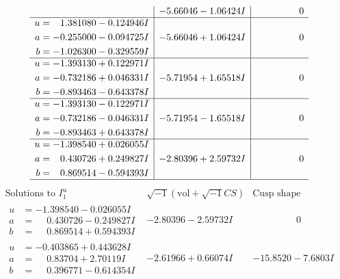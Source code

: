 \documentclass[1p]{elsarticle_modified}
\theoremstyle{definition}
\newcommand{\I}{\sqrt{-1}}
\begin{document}
$$\begin{array}{c|c|c}
 & -5.66046 - 1.06424 I & \phantom{-0.000000 } 0 \\ \hline\begin{aligned}
u &= \phantom{-}1.381080 - 0.124946 I \\
a &= -0.255000 - 0.094725 I \\
b &= -1.026300 - 0.329559 I\end{aligned}
 & -5.66046 + 1.06424 I & \phantom{-0.000000 } 0 \\ \hline\begin{aligned}
u &= -1.393130 + 0.122971 I \\
a &= -0.732186 + 0.046331 I \\
b &= -0.893463 - 0.643378 I\end{aligned}
 & -5.71954 + 1.65518 I & \phantom{-0.000000 } 0 \\ \hline\begin{aligned}
u &= -1.393130 - 0.122971 I \\
a &= -0.732186 - 0.046331 I \\
b &= -0.893463 + 0.643378 I\end{aligned}
 & -5.71954 - 1.65518 I & \phantom{-0.000000 } 0 \\ \hline\begin{aligned}
u &= -1.398540 + 0.026055 I \\
a &= \phantom{-}0.430726 + 0.249827 I \\
b &= \phantom{-}0.869514 - 0.594393 I\end{aligned}
 & -2.80396 + 2.59732 I & \phantom{-0.000000 } 0\\
 \hline 
 \end{array}$$\newpage$$\begin{array}{c|c|c}  
\text{Solutions to }I^u_{1}& \I (\text{vol} + \sqrt{-1}CS) & \text{Cusp shape}\\
 \hline 
\begin{aligned}
u &= -1.398540 - 0.026055 I \\
a &= \phantom{-}0.430726 - 0.249827 I \\
b &= \phantom{-}0.869514 + 0.594393 I\end{aligned}
 & -2.80396 - 2.59732 I & \phantom{-0.000000 } 0 \\ \hline\begin{aligned}
u &= -0.403865 + 0.443628 I \\
a &= \phantom{-}0.83704 + 2.70119 I \\
b &= \phantom{-}0.396771 - 0.614354 I\end{aligned}
 & -2.61966 + 0.66074 I & -15.8520 - 7.6803 I \\ \hline\begin{aligned}

\end{aligned}
\end{array}$$
\end{document}
